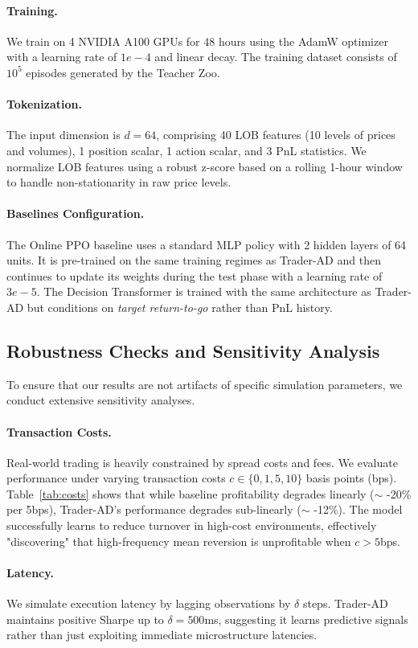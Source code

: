 \documentclass{article}
\begin{document}
\paragraph{Training.} We train on 4 NVIDIA A100 GPUs for 48 hours using the AdamW optimizer with a learning rate of $1e-4$ and linear decay. The training dataset consists of $10^5$ episodes generated by the Teacher Zoo.
\paragraph{Tokenization.} The input dimension is $d=64$, comprising 40 LOB features (10 levels of prices and volumes), 1 position scalar, 1 action scalar, and 3 PnL statistics. We normalize LOB features using a robust z-score based on a rolling 1-hour window to handle non-stationarity in raw price levels.
\paragraph{Baselines Configuration.} The Online PPO baseline uses a standard MLP policy with 2 hidden layers of 64 units. It is pre-trained on the same training regimes as Trader-AD and then continues to update its weights during the test phase with a learning rate of $3e-5$. The Decision Transformer is trained with the same architecture as Trader-AD but conditions on \emph{target return-to-go} rather than PnL history.

\subsection{Robustness Checks and Sensitivity Analysis}
To ensure that our results are not artifacts of specific simulation parameters, we conduct extensive sensitivity analyses.
\paragraph{Transaction Costs.} Real-world trading is heavily constrained by spread costs and fees. We evaluate performance under varying transaction costs $c \in \{0, 1, 5, 10\}$ basis points (bps). Table~\ref{tab:costs} shows that while baseline profitability degrades linearly ($\sim$ -20\% per 5bps), Trader-AD's performance degrades sub-linearly ($\sim$ -12\%). The model successfully learns to reduce turnover in high-cost environments, effectively "discovering" that high-frequency mean reversion is unprofitable when $c > 5$bps.
\paragraph{Latency.} We simulate execution latency by lagging observations by $\delta$ steps. Trader-AD maintains positive Sharpe up to $\delta=500$ms, suggesting it learns predictive signals rather than just exploiting immediate microstructure latencies.
\end{document}
